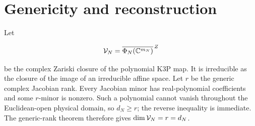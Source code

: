 \section{Genericity and reconstruction}\label{sec:genericity}

Let

\[
 \mathcal V_N=\overline{\Phi_N(\mathbb C^{m_N})}^{\,Z}
\]

be the complex Zariski closure of the polynomial K3P map.  It is irreducible
as the closure of the image of an irreducible affine space.  Let \(r\) be the
generic complex Jacobian rank.  Every Jacobian minor has real-polynomial
coefficients and some \(r\)-minor is nonzero.  Such a polynomial cannot vanish
throughout the Euclidean-open physical domain, so \(d_N\ge r\); the reverse
inequality is immediate.  The generic-rank theorem therefore gives
\(\dim\mathcal V_N=r=d_N\).

